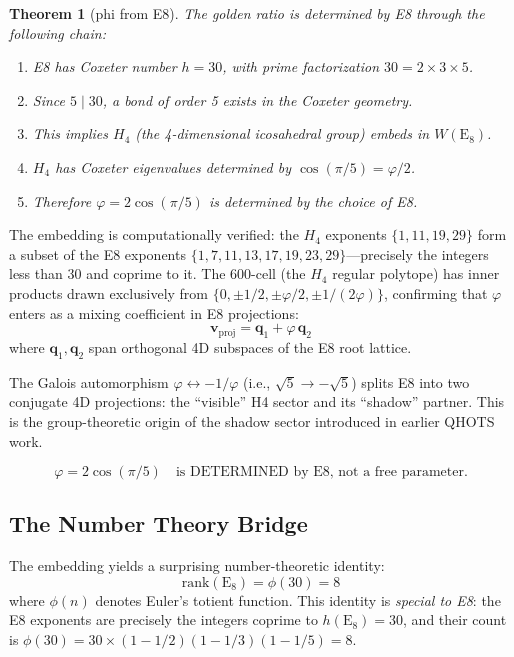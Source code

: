 \documentclass[aps,prd,twocolumn,superscriptaddress,floatfix,nofootinbib]{revtex4-2}
\newtheorem{theorem}{Theorem}
\theoremstyle{definition}
\theoremstyle{remark}
\newcommand{\vp}{\varphi}
\begin{document}
\begin{theorem}[phi from E8]
The golden ratio is determined by E8 through the following chain:
\begin{enumerate}
    \item E8 has Coxeter number $h = 30$, with prime factorization $30 = 2 \times 3 \times 5$.
    \item Since $5 \mid 30$, a bond of order 5 exists in the Coxeter geometry.
    \item This implies $H_4$ (the 4-dimensional icosahedral group) embeds in $W(\text{E}_8)$.
    \item $H_4$ has Coxeter eigenvalues determined by $\cos(\pi/5) = \vp/2$.
    \item Therefore $\vp = 2\cos(\pi/5)$ is determined by the choice of E8.
\end{enumerate}
\end{theorem}

\noindent
The embedding is computationally verified: the $H_4$ exponents $\{1, 11, 19, 29\}$
form a subset of the E8 exponents $\{1, 7, 11, 13, 17, 19, 23, 29\}$---precisely
the integers less than 30 and coprime to it. The 600-cell (the $H_4$ regular polytope)
has inner products drawn exclusively from $\{0, \pm 1/2, \pm \vp/2, \pm 1/(2\vp)\}$,
confirming that $\vp$ enters as a mixing coefficient in E8 projections:
\begin{equation}
    \mathbf{v}_{\text{proj}} = \mathbf{q}_1 + \vp \, \mathbf{q}_2
\end{equation}
where $\mathbf{q}_1, \mathbf{q}_2$ span orthogonal 4D subspaces of the E8 root lattice.

The Galois automorphism $\vp \leftrightarrow -1/\vp$ (i.e., $\sqrt{5} \to -\sqrt{5}$)
splits E8 into two conjugate 4D projections: the ``visible'' H4 sector and its
``shadow'' partner. This is the group-theoretic origin of the shadow sector
introduced in earlier QHOTS work.

\begin{equation}
    \vp = 2\cos(\pi/5) \quad \text{is DETERMINED by E8, not a free parameter.}
\end{equation}

\subsection{The Number Theory Bridge}

The embedding yields a surprising number-theoretic identity:
\begin{equation}
    \text{rank}(\text{E}_8) = \phi(30) = 8
\end{equation}
where $\phi(n)$ denotes Euler's totient function. This identity is \emph{special to E8}:
the E8 exponents are precisely the integers coprime to $h(\text{E}_8) = 30$, and their
count is $\phi(30) = 30 \times (1 - 1/2)(1 - 1/3)(1 - 1/5) = 8$.
\end{document}
